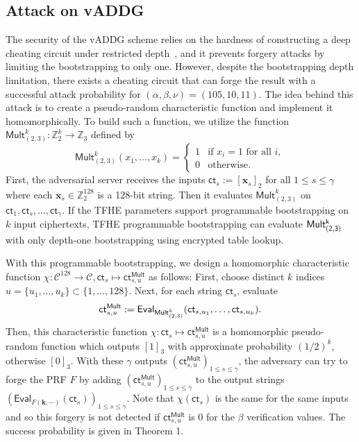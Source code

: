 \documentclass[runningheads]{llncs}
\newcommand{\bb}[1]{\mathbb{#1}}  %
\newcommand{\cc}[1]{\mathcal{#1}} %
\newcommand{\ct}{\textsf{ct}{}}
\newcommand{\eval}{\textsf{Eval}}
\begin{document}
        \subsection{Attack on vADDG}
        The security of the vADDG scheme relies on the hardness of constructing a deep cheating circuit under restricted depth~\cite{CHLR18}, and it prevents forgery attacks by limiting the bootstrapping to only one. However, despite the bootstrapping depth limitation, there exists a cheating circuit that can forge the result with a successful attack probability for \((\alpha,\beta,\nu)=(105,10,11)\). The idea behind this attack is to create a pseudo-random characteristic function and implement it homomorphically. To build such a function, we utilize the function \(\mathsf{Mult}^k_{(2,3)}:\mathbb{Z}_2^k\to \mathbb{Z}_3\) defined by
        \[
            \mathsf{Mult}^k_{(2,3)}(x_1,\dots,x_k)=
            \begin{cases}
            1 & \text{if } x_i=1 \text{ for all } i,\\[1mm]
            0 & \text{otherwise.}
            \end{cases}
        \]
        First, the adversarial server receives the inputs $\ct_s:=[\mathbf{x}_s]_2$ for all $1\leq s \leq \gamma$ where each $\mathbf{x}_s\in \bb Z_2^{128}$ is a 128-bit string. Then it evaluates 
        $\mathsf{Mult}^k_{(2,3)}$ on $\ct_1,\ct_s, \dots, \ct_\gamma$.        
        If the TFHE parameters support programmable bootstrapping on $k$ input ciphertexts, TFHE programmable bootstrapping can evaluate ${\sf Mult^k_{(2,3)}}$ with only depth-one bootstrapping using encrypted table lookup. 
        
        With this programmable bootstrapping, we design a homomorphic characteristic function $\chi: \cc C^{128}\to \cc C,  \ct_s\mapsto\ct^{\mathsf{Mult}}_{s,u}$ as follows:
        First, choose distinct $k$ indices $u=\{u_1,\dots,u_k\}\subset\{1,\dots,128\}$. Next, for each string $\ct_s$, evaluate 
                $$\ct^{\mathsf{Mult}}_{s,u}:=\eval_{{\sf Mult}^k_{(2,3)}}(\ct_{s,u_1},\dots,\ct_{s,u_k}).$$
        Then, this characteristic function $\chi: \ct_s\mapsto \ct^{\mathsf{Mult}}_{s,u}$ is a homomorphic pseudo-random function which outputs $[1]_3$ with approximate probability $(1/2)^k$, otherwise $[0]_3$.
        With these $\gamma$ outputs $(\ct^{\mathsf{Mult}}_{s,u})_{1\leq s\leq \gamma}$, the adversary can try to forge the PRF $F$ by adding $(\ct^{\mathsf{Mult}}_{s,u})_{1\leq s\leq \gamma}$ to the output strings $\left(\eval_{F(\mathbf{k,-})}(\ct_s)\right)_{1\leq s\leq \gamma}$.
    Note that $\chi(\ct_s)$ is the same for the same inputs and so this forgery is not detected if $\ct^{\mathsf{Mult}}_{s,u}$ is 0 for the $\beta$ verification values. The success probability is given in Theorem 1.
\end{document}
